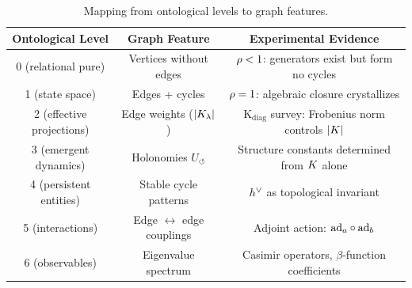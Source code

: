 \begin{table}[h]
\centering
\begin{tabular}{c c c}
\hline\hline
Ontological Level & Graph Feature & Experimental Evidence \\
\hline
0 (relational pure) & Vertices without edges & $\rho < 1$: generators exist but form no cycles \\
1 (state space) & Edges + cycles & $\rho = 1$: algebraic closure crystallizes \\
2 (effective projections) & Edge weights ($|K_\lambda|$) & K$_{\mathrm{diag}}$ survey: Frobenius norm controls $|K|$ \\
3 (emergent dynamics) & Holonomies $U_\circlearrowleft$ & Structure constants determined from $K$ alone \\
4 (persistent entities) & Stable cycle patterns & $h^\vee$ as topological invariant \\
5 (interactions) & Edge $\leftrightarrow$ edge couplings & Adjoint action: $\mathrm{ad}_a \circ \mathrm{ad}_b$ \\
6 (observables) & Eigenvalue spectrum & Casimir operators, $\beta$-function coefficients \\
\hline\hline
\end{tabular}
\caption{Mapping from ontological levels to graph features.}
\end{table}
